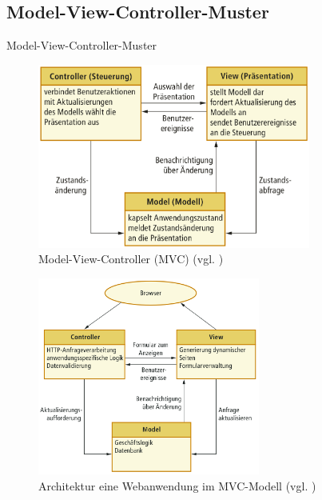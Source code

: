\documentclass{beamer}
\begin{document}
			\subsection{Model-View-Controller-Muster}
			\begin{frame}[allowframebreaks]{Model-View-Controller-Muster}
			   	\begin{figure}
					\includegraphics[width=0.8\textwidth]{mvc.png}
					\caption{Model-View-Controller (MVC) (vgl. \cite[ S.193]{sommer})}
				\end{figure}
				\begin{figure}
					\includegraphics[width=0.65\textwidth]{mvc_bsp.png}
					\caption{Architektur eine Webanwendung im MVC-Modell (vgl. \cite[ S.193]{sommer})}
				\end{figure}
			\end{frame}
\end{document}
